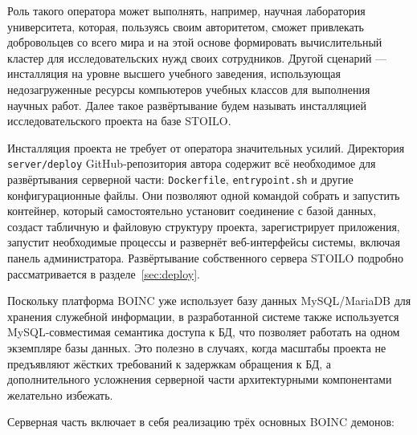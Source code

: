 \documentclass[a4paper,12pt]{extarticle}
\begin{document}
Роль такого оператора может выполнять, например, научная лаборатория университета, которая, пользуясь своим авторитетом, сможет привлекать добровольцев со всего мира и на этой основе формировать вычислительный кластер для исследовательских нужд своих сотрудников.
Другой сценарий — инсталляция на уровне высшего учебного заведения, использующая недозагруженные ресурсы компьютеров учебных классов для выполнения научных работ.
Далее такое развёртывание будем называть инсталляцией исследовательского проекта на базе STOILO.

Инсталляция проекта не требует от оператора значительных усилий.
Директория \texttt{server/deploy} GitHub-репозитория автора содержит всё необходимое для развёртывания серверной части: \texttt{Dockerfile}, \texttt{entrypoint.sh} и другие конфигурационные файлы.
Они позволяют одной командой собрать и запустить контейнер, который самостоятельно установит соединение с базой данных, создаст табличную и файловую структуру проекта, зарегистрирует приложения, запустит необходимые процессы и развернёт веб-интерфейсы системы, включая панель администратора.
Развёртывание собственного сервера STOILO подробно рассматривается в разделе~\ref{sec:deploy}.

Поскольку платформа BOINC уже использует базу данных MySQL/MariaDB для хранения служебной информации, в разработанной системе также используется MySQL-совместимая семантика доступа к БД, что позволяет работать на одном экземпляре базы данных.
Это полезно в случаях, когда масштабы проекта не предъявляют жёстких требований к задержкам обращения к БД, а дополнительного усложнения серверной части архитектурными компонентами желательно избежать.

Серверная часть включает в себя реализацию трёх основных BOINC демонов:
\end{document}
